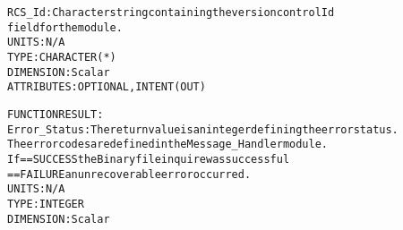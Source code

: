 \begin{alltt}
        RCS_Id:       Character string containing the version control Id
                      field for the module.
                      UNITS:      N/A
                      TYPE:       CHARACTER(*)
                      DIMENSION:  Scalar
                      ATTRIBUTES: OPTIONAL, INTENT(OUT)
 
  FUNCTION RESULT:
        Error_Status: The return value is an integer defining the error status.
                      The error codes are defined in the Message_Handler module.
                      If == SUCCESS the Binary file inquire was successful
                         == FAILURE an unrecoverable error occurred.
                      UNITS:      N/A
                      TYPE:       INTEGER
                      DIMENSION:  Scalar
 
  \end{alltt}
